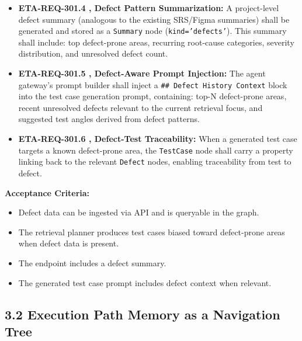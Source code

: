 \begin{itemize}[leftmargin=1.4em,itemsep=1pt,topsep=3pt]
  \item \textbf{ETA-REQ-301.4 ,  Defect Pattern Summarization:} A project-level defect summary (analogous to the existing SRS/Figma summaries) shall be generated and stored as a \texttt{Summary} node (\texttt{kind='defects'}). This summary shall include: top defect-prone areas, recurring root-cause categories, severity distribution, and unresolved defect count.
\end{itemize}

\begin{itemize}[leftmargin=1.4em,itemsep=1pt,topsep=3pt]
  \item \textbf{ETA-REQ-301.5 ,  Defect-Aware Prompt Injection:} The agent gateway's prompt builder shall inject a \texttt{\#\# Defect History Context} block into the test case generation prompt, containing: top-N defect-prone areas, recent unresolved defects relevant to the current retrieval focus, and suggested test angles derived from defect patterns.
\end{itemize}

\begin{itemize}[leftmargin=1.4em,itemsep=1pt,topsep=3pt]
  \item \textbf{ETA-REQ-301.6 ,  Defect-Test Traceability:} When a generated test case targets a known defect-prone area, the \texttt{TestCase} node shall carry a  property linking back to the relevant \texttt{Defect} nodes, enabling traceability from test to defect.
\end{itemize}

\textbf{Acceptance Criteria:}
\begin{itemize}[leftmargin=1.4em,itemsep=1pt,topsep=3pt]
  \item Defect data can be ingested via API and is queryable in the graph.
  \item The retrieval planner produces test cases biased toward defect-prone areas when defect data is present.
  \item The  endpoint includes a defect summary.
  \item The generated test case prompt includes defect context when relevant.
\end{itemize}

\subsection*{3.2 Execution Path Memory as a Navigation Tree}

